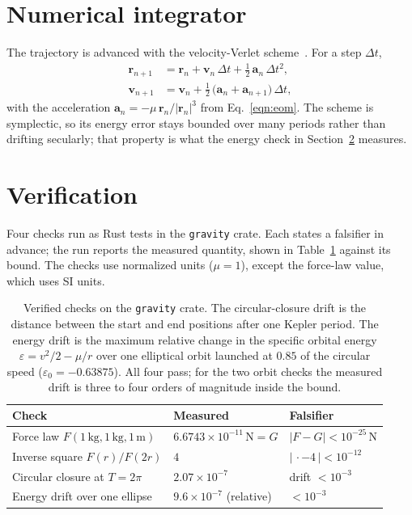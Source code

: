 \documentclass[11pt]{article}
\begin{document}
\section{Numerical integrator}
\label{sec:integrator}

The trajectory is advanced with the velocity-Verlet scheme~\citep{Swope1982}.
For a step $\Delta t$,
\begin{align}
  \mathbf{r}_{n+1} &= \mathbf{r}_{n} + \mathbf{v}_{n}\,\Delta t
    + \tfrac{1}{2}\,\mathbf{a}_{n}\,\Delta t^{2}, \label{eqn:vvpos}\\
  \mathbf{v}_{n+1} &= \mathbf{v}_{n}
    + \tfrac{1}{2}\,\bigl(\mathbf{a}_{n} + \mathbf{a}_{n+1}\bigr)\,\Delta t,
    \label{eqn:vvvel}
\end{align}
with the acceleration
$\mathbf{a}_{n} = -\mu\,\mathbf{r}_{n}/\lvert\mathbf{r}_{n}\rvert^{3}$ from
Eq.~\eqref{eqn:eom}. The scheme is symplectic, so its energy error stays
bounded over many periods rather than drifting secularly; that property is
what the energy check in Section~\ref{sec:verification} measures.

\section{Verification}
\label{sec:verification}

Four checks run as Rust tests in the \texttt{gravity} crate. Each states a
falsifier in advance; the run reports the measured quantity, shown in
Table~\ref{tab:checks} against its bound. The checks use normalized units
($\mu = 1$), except the force-law value, which uses SI units.

\begin{table}[h]
  \centering
  \begin{tabular}{@{}lll@{}}
    \toprule
    Check & Measured & Falsifier \\
    \midrule
    Force law $F(1\,\mathrm{kg},1\,\mathrm{kg},1\,\mathrm{m})$
      & $6.6743\times10^{-11}\,\mathrm{N} = G$
      & $\lvert F - G\rvert < 10^{-25}\,\mathrm{N}$ \\
    Inverse square $F(r)/F(2r)$
      & $4$ & $\lvert\,\cdot - 4\,\rvert < 10^{-12}$ \\
    Circular closure at $T = 2\pi$
      & $2.07\times10^{-7}$ & drift $< 10^{-3}$ \\
    Energy drift over one ellipse
      & $9.6\times10^{-7}$ (relative) & $< 10^{-3}$ \\
    \bottomrule
  \end{tabular}
  \caption{Verified checks on the \texttt{gravity} crate. The circular-closure
  drift is the distance between the start and end positions after one Kepler
  period. The energy drift is the maximum relative change in the specific
  orbital energy $\varepsilon = v^{2}/2 - \mu/r$ over one elliptical orbit
  launched at $0.85$ of the circular speed ($\varepsilon_0 = -0.63875$). All
  four pass; for the two orbit checks the measured drift is three to four
  orders of magnitude inside the bound.}
  \label{tab:checks}
\end{table}
\end{document}
